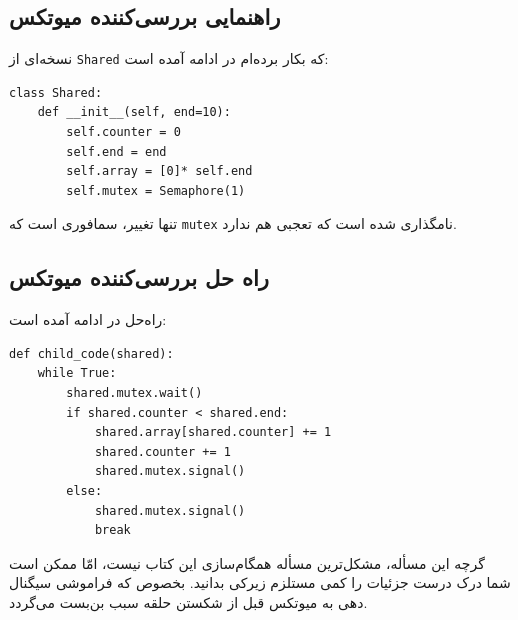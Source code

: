 \documentclass{book}
\newcommand{\clearemptydoublepage}{\newpage\cleardoublepage}
\begin{document}
\clearemptydoublepage
\subsection{راهنمایی بررسی‌کننده میوتکس}

    نسخه‌ای از  {\tt Shared} که بکار برده‌ام در ادامه آمده است: 
\begin{latin}
\begin{lstlisting}
class Shared:
    def __init__(self, end=10):
        self.counter = 0
        self.end = end
        self.array = [0]* self.end
        self.mutex = Semaphore(1)
\end{lstlisting}
\end{latin}

    تنها تغییر،  سمافوری است که {\tt mutex} نامگذاری شده است که تعجبی هم ندارد. 

\clearemptydoublepage
\subsection{راه حل بررسی‌کننده میوتکس}

    راه‌حل در ادامه آمده است:

\begin{latin}
\begin{lstlisting}
def child_code(shared):
    while True:
        shared.mutex.wait()
        if shared.counter < shared.end:
            shared.array[shared.counter] += 1
            shared.counter += 1
            shared.mutex.signal()
        else:
            shared.mutex.signal()
            break
\end{lstlisting}
\end{latin}

    گرچه این مسأله، مشکل‌ترین مسأله همگام‌سازی این کتاب نیست، امّا ممکن است شما درک درست جزئیات را کمی مستلزم زیرکی بدانید.
    بخصوص که فراموشی سیگنال دهی به میوتکس قبل از شکستن حلقه سبب بن‌بست می‌گردد. 
\end{document}
